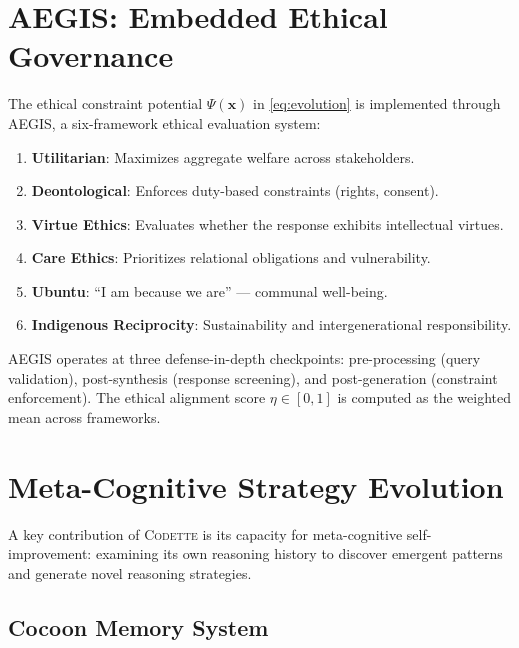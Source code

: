 \documentclass[11pt,a4paper]{article}
\newcommand{\codette}{\textsc{Codette}}
\begin{document}
\section{AEGIS: Embedded Ethical Governance}
\label{sec:aegis}

The ethical constraint potential $\Psi(\mathbf{x})$ in \cref{eq:evolution} is implemented through AEGIS, a six-framework ethical evaluation system:

\begin{enumerate}[nosep]
  \item \textbf{Utilitarian}: Maximizes aggregate welfare across stakeholders.
  \item \textbf{Deontological}: Enforces duty-based constraints (rights, consent).
  \item \textbf{Virtue Ethics}: Evaluates whether the response exhibits intellectual virtues.
  \item \textbf{Care Ethics}: Prioritizes relational obligations and vulnerability.
  \item \textbf{Ubuntu}: ``I am because we are'' --- communal well-being.
  \item \textbf{Indigenous Reciprocity}: Sustainability and intergenerational responsibility.
\end{enumerate}

AEGIS operates at three defense-in-depth checkpoints: pre-processing (query validation), post-synthesis (response screening), and post-generation (constraint enforcement). The ethical alignment score $\eta \in [0,1]$ is computed as the weighted mean across frameworks.

\section{Meta-Cognitive Strategy Evolution}
\label{sec:metacognition}

A key contribution of \codette{} is its capacity for meta-cognitive self-improvement: examining its own reasoning history to discover emergent patterns and generate novel reasoning strategies.

\subsection{Cocoon Memory System}
\end{document}

